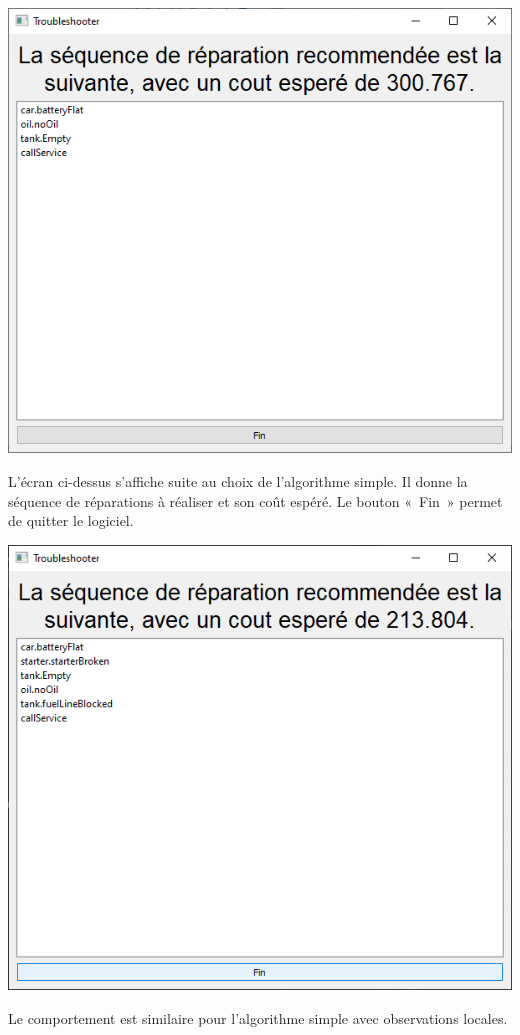 \documentclass[a4paper,11pt]{article}
\theoremstyle{plain}
\theoremstyle{definition}
\begin{document}
\begin{center}
\includegraphics[scale=0.667]{Figures/algo_simples}
\end{center}
L'écran ci-dessus s'affiche suite au choix de l'algorithme simple. Il donne la séquence de réparations à réaliser et son coût espéré. Le bouton «~Fin~» permet de quitter le logiciel.

\begin{center}
\includegraphics[scale=0.667]{Figures/algo_simples_obs}
\end{center}
Le comportement est similaire pour l'algorithme simple avec observations locales.
\end{document}
